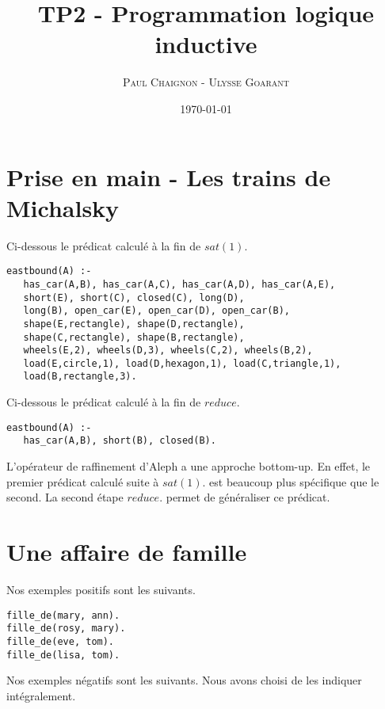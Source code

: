 \documentclass[a4paper,12pt]{article}
\title{TP2 - Programmation logique inductive}
\author{\textsc{Paul Chaignon} - \textsc{Ulysse Goarant}}
\date{\today}
\begin{document}
\lstset{language=Prolog, breaklines=true}

\maketitle

\section{Prise en main - Les trains de Michalsky}

Ci-dessous le prédicat calculé à la fin de $sat(1).$
\begin{lstlisting}[frame=single]
eastbound(A) :-
   has_car(A,B), has_car(A,C), has_car(A,D), has_car(A,E),
   short(E), short(C), closed(C), long(D),
   long(B), open_car(E), open_car(D), open_car(B),
   shape(E,rectangle), shape(D,rectangle),
   shape(C,rectangle), shape(B,rectangle),
   wheels(E,2), wheels(D,3), wheels(C,2), wheels(B,2),
   load(E,circle,1), load(D,hexagon,1), load(C,triangle,1),
   load(B,rectangle,3).
\end{lstlisting}

Ci-dessous le prédicat calculé à la fin de $reduce.$
\begin{lstlisting}[frame=single]
eastbound(A) :-
   has_car(A,B), short(B), closed(B).
\end{lstlisting}

L'opérateur de raffinement d'Aleph a une approche bottom-up.
En effet, le premier prédicat calculé suite à $sat(1).$ est beaucoup plus spécifique que le second.
La second étape $reduce.$ permet de généraliser ce prédicat.

\section{Une affaire de famille}
Nos exemples positifs sont les suivants.

\begin{lstlisting}[frame=single]
fille_de(mary, ann).
fille_de(rosy, mary).
fille_de(eve, tom).
fille_de(lisa, tom).
\end{lstlisting}

Nos exemples négatifs sont les suivants. Nous avons choisi de les indiquer intégralement.
\end{document}
